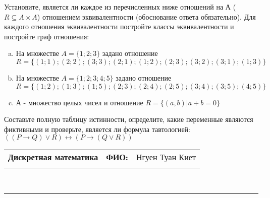 \documentclass[10pt]{exam}
\newcommand{\class}{Дискретная математика}
\newcommand{\examdate}{}
\begin{document}
\begin{questions}
\question
Установите, является ли каждое из перечисленных ниже отношений на А ($R \subseteq A \times A$) отношением эквивалентности (обоснование ответа обязательно). Для каждого отношения эквивалентности постройте классы 
эквивалентности и постройте граф отношения:
\begin{enumerate} [a)]\setcounter{enumi}{0}
\item На множестве $A = \{1; 2; 3\}$ задано отношение $R = \{(1; 1); (2; 2); (3; 3); (2; 1); (1; 2); (2; 3); (3; 2); (3; 1); (1; 3)\}$
\item На множестве $A = \{1; 2; 3; 4; 5\}$ задано отношение $R = \{(1; 2); (1; 3); (1; 5); (2; 3); (2; 4); (2; 5); (3; 4); (3; 5); (4; 5)\}$
\item А - множество целых чисел и отношение $R = \{(a,b)|a + b = 0\}$
\end{enumerate}\question Составьте полную таблицу истинности, определите, какие переменные являются фиктивными и проверьте, является ли формула тавтологией:
$((P \rightarrow Q) \lor R) \leftrightarrow (P \rightarrow (Q \lor R))$

\end{questions}
\newpage
\begin{flushright}
\begin{tabular}{p{2.8in} r l}
\textbf{\class} & \textbf{ФИО:} &Нгуен Туан Киет
\\

\textbf{\examdate} &&\\
\end{tabular}\\
\end{flushright}
\rule[1ex]{\textwidth}{.1pt}
\end{document}
